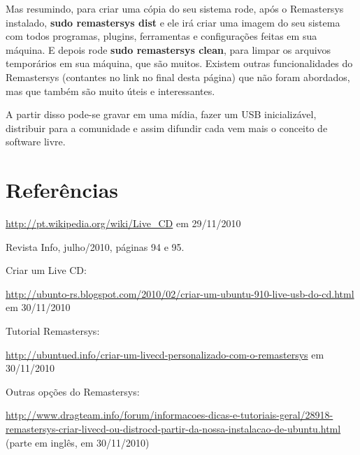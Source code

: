 \documentclass[12pt, a4paper, tocpage=plain]{abnt} %
\begin{document}
Mas resumindo, para criar uma cópia do seu sistema rode, após o Remastersys instalado, {\bf sudo remastersys dist} e ele irá criar uma imagem do seu sistema com todos programas, plugins, ferramentas e configurações feitas em sua máquina. E depois rode {\bf sudo remastersys clean}, para limpar os arquivos temporários em sua máquina, que são muitos. Existem outras funcionalidades do Remastersys (contantes no link no final desta página) que não foram abordados, mas que também são muito úteis e interessantes. 

A partir disso pode-se gravar em uma mídia, fazer um USB inicializável, distribuir para a comunidade e assim difundir cada vem mais o conceito de software livre.

\chapter{Referências}
\url{http://pt.wikipedia.org/wiki/Live_CD} em 29/11/2010

Revista Info, julho/2010, páginas 94 e 95.

Criar um Live CD: 

\url{http://ubunto-rs.blogspot.com/2010/02/criar-um-ubuntu-910-live-usb-do-cd.html} em 30/11/2010

Tutorial Remastersys:

\url{http://ubuntued.info/criar-um-livecd-personalizado-com-o-remastersys} em 30/11/2010

Outras opções do Remastersys:

\url{http://www.dragteam.info/forum/informacoes-dicas-e-tutoriais-geral/28918-remastersys-criar-livecd-ou-distrocd-partir-da-nossa-instalacao-de-ubuntu.html} (parte em inglês, em 30/11/2010)
\end{document}
